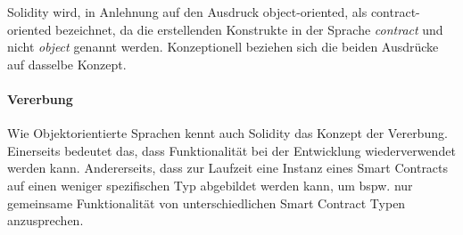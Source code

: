 Solidity wird, in Anlehnung auf den Ausdruck object-oriented, als contract-oriented bezeichnet, da die erstellenden Konstrukte in der Sprache \emph{contract} und nicht \emph{object} genannt werden. Konzeptionell beziehen sich die beiden Ausdrücke auf dasselbe Konzept.

\paragraph{Vererbung}
\label{para:Vererbung}
Wie Objektorientierte Sprachen kennt auch Solidity das Konzept der Vererbung. Einerseits bedeutet das, dass Funktionalität bei der Entwicklung wiederverwendet werden kann. Andererseits, dass zur Laufzeit eine Instanz eines Smart Contracts auf einen weniger spezifischen Typ abgebildet werden kann, um bspw. nur gemeinsame Funktionalität von unterschiedlichen Smart Contract Typen anzusprechen.